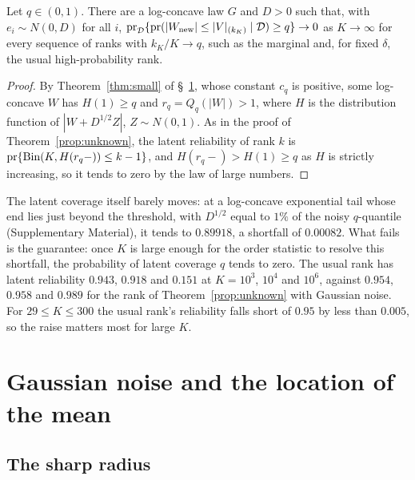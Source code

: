 \documentclass[lineno]{biometrika}
\newcommand{\pr}{\mathrm{pr}}
\begin{document}
\begin{proposition}\label{prop:fail}
Let $q \in (0,1)$. There are a log-concave law $G$ and $D > 0$ such that, with $e_i \sim N(0, D)$ for all $i$, $\pr_{\mathcal D}\{\pr(|W_{\rm new}| \le |V|_{(k_K)} \mid \mathcal D) \ge q\} \to 0$ as $K \to \infty$ for every sequence of ranks with $k_K/K \to q$, such as the marginal and, for fixed $\delta$, the usual high-probability rank.
\end{proposition}

\begin{proof}
By Theorem~\ref{thm:small} of \S~\ref{sec:mean}, whose constant $c_q$ is positive, some log-concave $W$ has $H(1) \ge q$ and $r_q = Q_q(|W|) > 1$, where $H$ is the distribution function of $|W + D^{1/2}Z|$, $Z \sim N(0, 1)$. As in the proof of Theorem~\ref{prop:unknown}, the latent reliability of rank $k$ is $\pr\{{\rm Bin}(K, H(r_q-)) \le k - 1\}$, and $H(r_q-) > H(1) \ge q$ as $H$ is strictly increasing, so it tends to zero by the law of large numbers.
\end{proof}

The latent coverage itself barely moves: at a log-concave exponential tail whose end lies just beyond the threshold, with $D^{1/2}$ equal to $1\%$ of the noisy $q$-quantile (Supplementary Material), it tends to $0.89918$, a shortfall of $0.00082$. What fails is the guarantee: once $K$ is large enough for the order statistic to resolve this shortfall, the probability of latent coverage $q$ tends to zero. The usual rank has latent reliability $0.943$, $0.918$ and $0.151$ at $K = 10^3$, $10^4$ and $10^6$, against $0.954$, $0.958$ and $0.989$ for the rank of Theorem~\ref{prop:unknown} with Gaussian noise. For $29 \le K \le 300$ the usual rank's reliability falls short of $0.95$ by less than $0.005$, so the raise matters most for large $K$.

\section{Gaussian noise and the location of the mean}\label{sec:mean}

\subsection{The sharp radius}\label{sec:setup}
\end{document}
